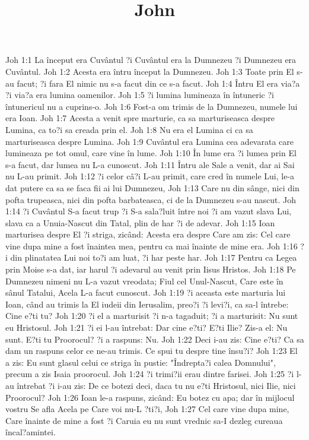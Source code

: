 

\title{John}

Joh 1:1  La început era Cuvântul ?i Cuvântul era la Dumnezeu ?i Dumnezeu era Cuvântul.
Joh 1:2  Acesta era întru început la Dumnezeu.
Joh 1:3  Toate prin El s-au facut; ?i fara El nimic nu s-a facut din ce s-a facut.
Joh 1:4  Întru El era via?a ?i via?a era lumina oamenilor.
Joh 1:5  ?i lumina lumineaza în întuneric ?i întunericul nu a cuprins-o.
Joh 1:6  Fost-a om trimis de la Dumnezeu, numele lui era Ioan.
Joh 1:7  Acesta a venit spre marturie, ca sa marturiseasca despre Lumina, ca to?i sa creada prin el.
Joh 1:8  Nu era el Lumina ci ca sa marturiseasca despre Lumina.
Joh 1:9  Cuvântul era Lumina cea adevarata care lumineaza pe tot omul, care vine în lume.
Joh 1:10  În lume era ?i lumea prin El s-a facut, dar lumea nu L-a cunoscut.
Joh 1:11  Întru ale Sale a venit, dar ai Sai nu L-au primit.
Joh 1:12  ?i celor câ?i L-au primit, care cred în numele Lui, le-a dat putere ca sa se faca fii ai lui Dumnezeu,
Joh 1:13  Care nu din sânge, nici din pofta trupeasca, nici din pofta barbateasca, ci de la Dumnezeu s-au nascut.
Joh 1:14  ?i Cuvântul S-a facut trup ?i S-a sala?luit între noi ?i am vazut slava Lui, slava ca a Unuia-Nascut din Tatal, plin de har ?i de adevar.
Joh 1:15  Ioan marturisea despre El ?i striga, zicând: Acesta era despre Care am zis: Cel care vine dupa mine a fost înaintea mea, pentru ca mai înainte de mine era.
Joh 1:16  ?i din plinatatea Lui noi to?i am luat, ?i har peste har.
Joh 1:17  Pentru ca Legea prin Moise s-a dat, iar harul ?i adevarul au venit prin Iisus Hristos.
Joh 1:18  Pe Dumnezeu nimeni nu L-a vazut vreodata; Fiul cel Unul-Nascut, Care este în sânul Tatalui, Acela L-a facut cunoscut.
Joh 1:19  ?i aceasta este marturia lui Ioan, când au trimis la El iudeii din Ierusalim, preo?i ?i levi?i, ca sa-l întrebe: Cine e?ti tu?
Joh 1:20  ?i el a marturisit ?i n-a tagaduit; ?i a marturisit: Nu sunt eu Hristosul.
Joh 1:21  ?i ei l-au întrebat: Dar cine e?ti? E?ti Ilie? Zis-a el: Nu sunt. E?ti tu Proorocul? ?i a raspuns: Nu.
Joh 1:22  Deci i-au zis: Cine e?ti? Ca sa dam un raspuns celor ce ne-au trimis. Ce spui tu despre tine însu?i?
Joh 1:23  El a zis: Eu sunt glasul celui ce striga în pustie: "Îndrepta?i calea Domnului", precum a zis Isaia proorocul.
Joh 1:24  ?i trimi?ii erau dintre farisei.
Joh 1:25  ?i l-au întrebat ?i i-au zis: De ce botezi deci, daca tu nu e?ti Hristosul, nici Ilie, nici Proorocul?
Joh 1:26  Ioan le-a raspuns, zicând: Eu botez cu apa; dar în mijlocul vostru Se afla Acela pe Care voi nu-L ?ti?i,
Joh 1:27  Cel care vine dupa mine, Care înainte de mine a fost ?i Caruia eu nu sunt vrednic sa-I dezleg cureaua încal?amintei.
